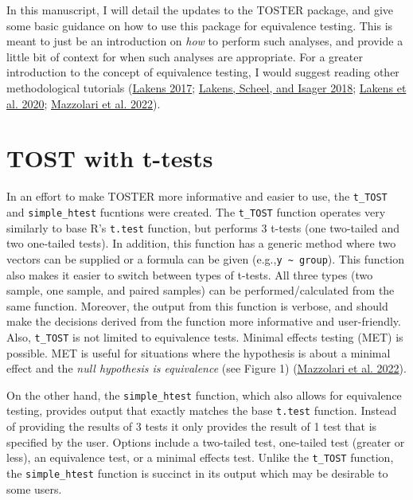 \documentclass[
]{interact}
\begin{document}
In this manuscript, I will detail the updates to the TOSTER package, and
give some basic guidance on how to use this package for equivalence
testing. This is meant to just be an introduction on \emph{how} to
perform such analyses, and provide a little bit of context for when such
analyses are appropriate. For a greater introduction to the concept of
equivalence testing, I would suggest reading other methodological
tutorials (\protect\hyperlink{ref-lakens_ori}{Lakens 2017};
\protect\hyperlink{ref-lakens2018equivalence}{Lakens, Scheel, and Isager
2018}; \protect\hyperlink{ref-lakens2020improving}{Lakens et al. 2020};
\protect\hyperlink{ref-mazzolari2022myths}{Mazzolari et al. 2022}).

\hypertarget{tost-with-t-tests}{%
\section{TOST with t-tests}\label{tost-with-t-tests}}

In an effort to make TOSTER more informative and easier to use, the
\texttt{t\_TOST} and \texttt{simple\_htest} fucntions were created. The
\texttt{t\_TOST} function operates very similarly to base R's
\texttt{t.test} function, but performs 3 t-tests (one two-tailed and two
one-tailed tests). In addition, this function has a generic method where
two vectors can be supplied or a formula can be given
(e.g.,\texttt{y\ \textasciitilde{}\ group}). This function also makes it
easier to switch between types of t-tests. All three types (two sample,
one sample, and paired samples) can be performed/calculated from the
same function. Moreover, the output from this function is verbose, and
should make the decisions derived from the function more informative and
user-friendly. Also, \texttt{t\_TOST} is not limited to equivalence
tests. Minimal effects testing (MET) is possible. MET is useful for
situations where the hypothesis is about a minimal effect and the
\emph{null hypothesis is equivalence} (see Figure 1)
(\protect\hyperlink{ref-mazzolari2022myths}{Mazzolari et al. 2022}).

On the other hand, the \texttt{simple\_htest} function, which also
allows for equivalence testing, provides output that exactly matches the
base \texttt{t.test} function. Instead of providing the results of 3
tests it only provides the result of 1 test that is specified by the
user. Options include a two-tailed test, one-tailed test (greater or
less), an equivalence test, or a minimal effects test. Unlike the
\texttt{t\_TOST} function, the \texttt{simple\_htest} function is
succinct in its output which may be desirable to some users.
\end{document}
